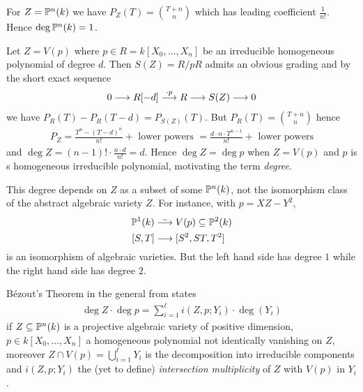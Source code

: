\documentclass[a4paper,parskip=half,numbers=enddot, DIV=12]{scrreprt}
\begin{document}
\begin{example}
    \begin{alphanumerate}
      \item 
        For $Z=\mathbb{P}^n(k)$ we have $P_Z(T) = \binom{T+n}n$ which has leading coefficient $\frac{1}{n!}$. Hence $\deg \mathbb{P}^n(k) = 1$.
    \item 
        Let $Z= V(p)$ where $p\in R = k[X_0,\ldots, X_n]$ be an irreducible homogeneous polynomial of degree $d$. Then $S(Z) = R/pR$ admits an obvious grading and by the short exact sequence
        \begin{align*}
            0\morphism R[-d]\morphism[\cdot p] R\morphism S (Z) \morphism 0
        \end{align*}
        we have $P_R(T) - P_R(T-d) = P_{S(Z)}(T)$. But $P_R(T) = \binom{T+n}n$ hence 
        \begin{align*}
        	P_Z = \frac{T^n-(T-d)^n}{n!} + \text{ lower powers } = \frac{d\cdot n\cdot T^{n-1}}{n!} + \text{ lower powers} 
        \end{align*}
        and $\deg Z = (n-1)! \cdot\frac{n\cdot d}{n!} = d$. Hence $\deg Z = \deg p$ when $Z=V(p)$ and $p$ is s homogeneous irreducible polynomial, motivating the term \emph{degree}.
    \end{alphanumerate}
\end{example}
\begin{rem*}
    This degree depends on $Z$ as a subset of some $\mathbb{P}^n(k)$, not the isomorphism class of the abstract algebraic variety $Z$. For instance, with $p= XZ-Y^2$,
    \begin{align*}
        \IP^1(k) &\isomorphism  V(p) \subseteq \IP^2(k)\\
        [S,T] &\morphism[] [S^2, ST, T^2]
    \end{align*}
    is an isomorphism of algebraic varieties. But the left hand side has degree $1$ while the right hand side has degree $2$.
\end{rem*}
\begin{rem*}
    B\'ezout's Theorem in the general from states 
    \begin{align*}
    	\deg Z\cdot \deg p = \sum_{i=1}^\ell i(Z,p; Y_i) \cdot \deg(Y_i)
    \end{align*}
     if $Z\subseteq \mathbb{P}^n(k)$ is a projective algebraic variety of positive dimension, $p\in k[X_0,\ldots, X_n]$ a homogeneous polynomial not identically vanishing on $Z$, moreover $Z\cap V(p) = \bigcup_{i=1}^\ell Y_i$ is the decomposition into irreducible components and $i(Z,p;Y_i)$ the (yet to define) \emph{intersection multiplicity} of $Z$ with $V(p)$ in $Y_i$.
\end{rem*}
\end{document}
